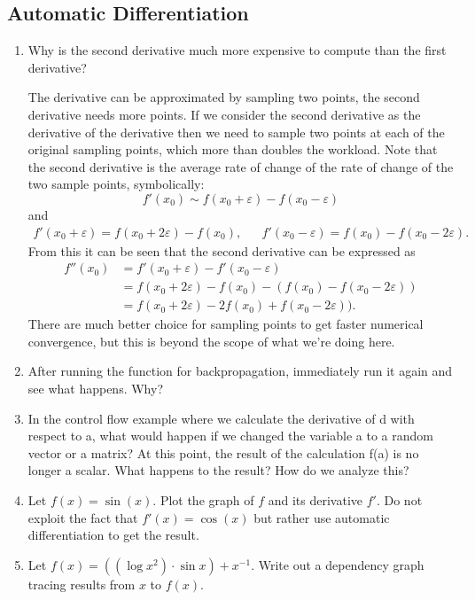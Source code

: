 \documentclass{article}
\begin{document}
\subsection{Automatic Differentiation}
\begin{enumerate}
\item Why is the second derivative much more expensive to compute than the first derivative?
	\begin{itemize}
		The derivative can be approximated by sampling two points, the second derivative needs more points. If we consider the second derivative as the derivative of the derivative then we need to sample two points at each of the original sampling points, which more than doubles the workload. Note that the second derivative is the average rate of change of the rate of change of the two sample points, symbolically:
		$$
		f'(x_0) \sim f(x_0 + \varepsilon) - f(x_0 - \varepsilon)
		$$
		and
		\begin{align*}
		f'(x_0 + \varepsilon) = f(x_0 + 2\varepsilon) - f(x_0),&&f'(x_0 - \varepsilon) = f(x_0) - f(x_0 - 2\varepsilon).
		\end{align*}
		From this it can be seen that the second derivative can be expressed as
		\begin{align*}
		f''(x_0) &= f'(x_0 + \varepsilon) - f'(x_0 - \varepsilon) \\
		&= f(x_0 + 2\varepsilon) - f(x_0) - (f(x_0) - f(x_0 - 2\varepsilon)) \\
		&= f(x_0 + 2\varepsilon) - 2f(x_0) + f(x_0 - 2\varepsilon)).
		\end{align*}
		There are much better choice for sampling points to get faster numerical convergence, but this is beyond the scope of what we're doing here. 
	\end{itemize}
\item After running the function for backpropagation, immediately run it again and see what happens. Why?
\item In the control flow example where we calculate the derivative of d with respect to a, what would happen if we changed the variable a to a random vector or a matrix? At this point, the result of the calculation f(a) is no longer a scalar. What happens to the result? How do we analyze this?
\item Let $f(x) = \sin(x)$. Plot the graph of $f$ and its derivative $f'$. Do not exploit the fact that $f'(x) = \cos(x)$ but rather use automatic differentiation to get the result.
\item Let $f(x) = ((\log x^2) \cdot \sin x) + x^{-1}$. Write out a dependency graph tracing results from $x$ to $f(x)$.

\end{enumerate}
\end{document}
